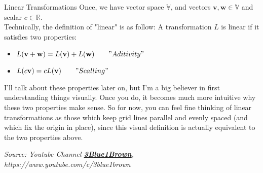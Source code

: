 \documentclass[12pt]{beamer}
\begin{document}
	\begin{frame}{Linear Transformations}
		Once, we have vector space $\mathbb{V}$, and vectors $ \mathbf{v},\mathbf{w} \in \mathbb{V}$ and scalar $c \in \mathbb{R}$. \\
		
		Technically, the definition of "linear" is as follow: A transformation $L$ is linear if it satisfies two properties:
		
		\begin{itemize}
			\item $ L( \mathbf{v} + \mathbf{w} )= L( \mathbf{v} )  + L( \mathbf{w} ) \qquad "Aditivity"$ 
			\item $ L(c \mathbf{v} ) = cL( \mathbf{v} ) \qquad "Scalling" $
		\end{itemize}
		\vspace{12px}
		
		I'll talk about these properties later on, but I'm a big believer in first understanding things visually. Once you do, it becomes much more intuitive why these two properties make sense. So for now, you can feel fine thinking of linear transformations as those which keep grid lines parallel and evenly spaced (and which fix the origin in place), since this visual definition is actually equivalent to the two properties above.
		\vspace{8px}
		
		\tiny \textit{Source: Youtube Channel \textbf{\href{https://www.youtube.com/watch?v=kYB8IZa5AuE}{3Blue1Brown}}, https://www.youtube.com/c/3blue1brown} 
		
	\end{frame}
\end{document}
